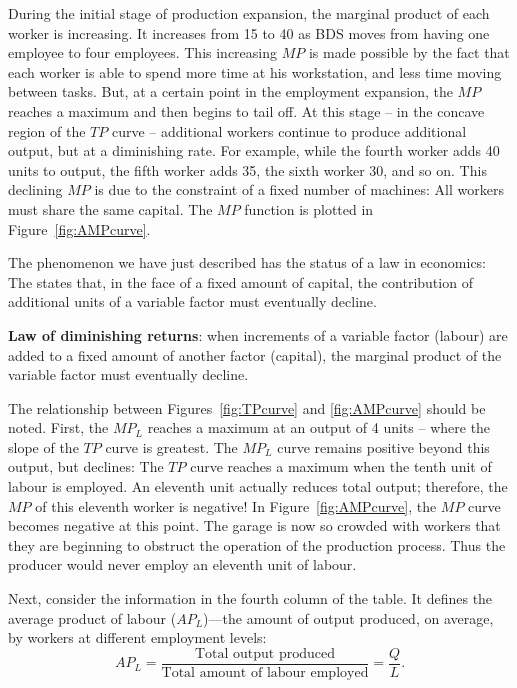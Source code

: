 \newhtmlpage



During the initial stage of production expansion, the marginal product of
each worker is increasing. It increases from 15 to 40 as BDS moves from
having one employee to four employees. This increasing $MP$ is made possible
by the fact that each worker is able to spend more time at his workstation,
and less time moving between tasks. But, at a certain point in the
employment expansion, the $MP$ reaches a maximum and then begins to tail
off. At this stage -- in the concave region of the $TP$ curve -- additional
workers continue to produce additional output, but at a diminishing rate.
For example, while the fourth worker adds 40 units to output, the fifth
worker adds 35, the sixth worker 30, and so on. This declining $MP$ is due
to the constraint of a fixed number of machines: All workers must share the
same capital. The $MP$ function is plotted in Figure~\ref{fig:AMPcurve}.

\newhtmlpage

The phenomenon we have just described has the status of a law in economics:
The  states that, in the face of a
fixed amount of capital, the contribution of additional units of a variable
factor must eventually decline.

\begin{DefBox}
	\textbf{Law of diminishing returns}: when increments of a variable factor (labour) are added to a fixed amount of another factor (capital), the marginal product of the variable factor must eventually decline.
\end{DefBox}

The relationship between Figures~\ref{fig:TPcurve} and \ref{fig:AMPcurve}
should be noted. First, the $MP_L$ reaches a maximum at an output of 4 units
-- where the slope of the $TP$ curve is greatest. The $MP_L$ curve remains
positive beyond this output, but declines: The $TP$ curve reaches a maximum
when the tenth unit of labour is employed. An eleventh unit actually reduces
total output; therefore, the $MP$ of this eleventh worker is negative! In
Figure~\ref{fig:AMPcurve}, the $MP$ curve becomes negative at this point.
The garage is now so crowded with workers that they are beginning to
obstruct the operation of the production process. Thus the producer would
never employ an eleventh unit of labour.

Next, consider the information in the fourth column of the table. It defines
the average product of labour ($AP_L$)---the amount of output produced, on
average, by workers at different employment levels:
\begin{equation*}
AP_{L}=\frac{\text{Total output produced}}{\text{Total amount of labour employed}}=\frac{Q}{L}.
\end{equation*}

